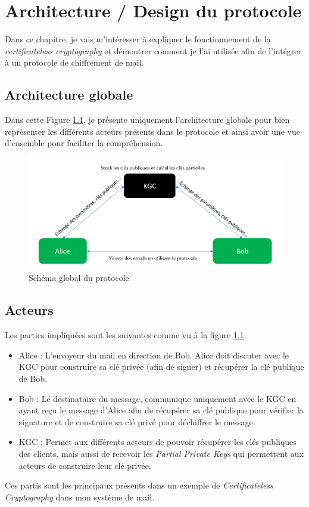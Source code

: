\chapter{Architecture / Design du protocole}
\label{ch:arch}
Dans ce chapitre, je vais m'intéresser à expliquer le fonctionnement de la \textit{certificateless cryptography} et démontrer comment je l'ai utilisée afin de l'intégrer à un protocole de chiffrement de mail.
\section{Architecture globale}
Dans cette Figure \ref{fig:globalProtocol}, je présente uniquement l'architecture globale pour bien représenter les différents acteurs présents dans le protocole et ainsi avoir une vue d'ensemble pour faciliter la compréhension.
\begin{figure}[h!]
	\centering
	\includegraphics[width=14cm]{images/SchemaGlobal.png}
	\caption{Schéma global du protocole}
	\label{fig:globalProtocol}
\end{figure}
\section{Acteurs}
Les parties impliquées sont les suivantes comme vu à la figure \ref{fig:globalProtocol}.
\begin{itemize}
	\item Alice : L'envoyeur du mail en direction de Bob. Alice doit discuter avec le KGC pour construire sa clé privée (afin de signer) et récupérer la clé publique de Bob.
	\item Bob : Le destinataire du message, communique uniquement avec le KGC en ayant reçu le message d'Alice afin de récupérer sa clé publique pour vérifier la signature et de construire sa clé privé pour déchiffrer le message.
	\item KGC : Permet aux différents acteurs de pouvoir récupérer les clés publiques des clients, mais aussi de  recevoir les \textit{Partial Private Keys} qui permettent aux acteurs de construire leur clé privée. 
\end{itemize}
Ces partis sont les principaux présents dans un exemple de \textit{Certificateless Cryptography} dans mon système de mail.
